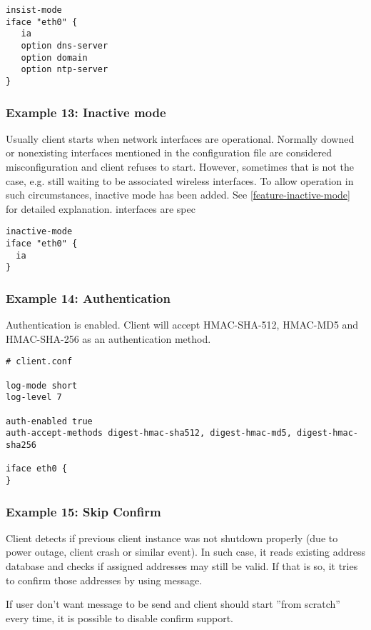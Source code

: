 \begin{lstlisting}
insist-mode
iface "eth0" {
   ia
   option dns-server
   option domain
   option ntp-server
}
\end{lstlisting}

\subsubsection{Example 13: Inactive mode}
\label{example-client-inactivemode}
Usually client starts when network interfaces are
operational. Normally downed or nonexisting interfaces mentioned in
the configuration file are considered misconfiguration and client
refuses to start. However, sometimes that is not the case, e.g. still
waiting to be associated wireless interfaces. To allow operation in
such circumstances, inactive mode has been added. See
\ref{feature-inactive-mode} for detailed explanation.
interfaces are spec

\begin{lstlisting}
inactive-mode
iface "eth0" {
  ia
}
\end{lstlisting}

\subsubsection{Example 14: Authentication}
\label{example-client-auth}
Authentication is enabled. Client will accept HMAC-SHA-512, HMAC-MD5
and HMAC-SHA-256 as an authentication method.

\begin{lstlisting}
# client.conf

log-mode short
log-level 7

auth-enabled true
auth-accept-methods digest-hmac-sha512, digest-hmac-md5, digest-hmac-sha256

iface eth0 {
}
\end{lstlisting}

\subsubsection{Example 15: Skip Confirm}
\label{example-client-confirm}
Client detects if previous client instance was not shutdown properly
(due to power outage, client crash or similar event). In such case, it
reads existing address database and checks if assigned addresses may
still be valid. If that is so, it tries to confirm those addresses by
using  message.

If user don't want  message to be send and client should
start ''from scratch'' every time, it is possible to disable confirm
support.

